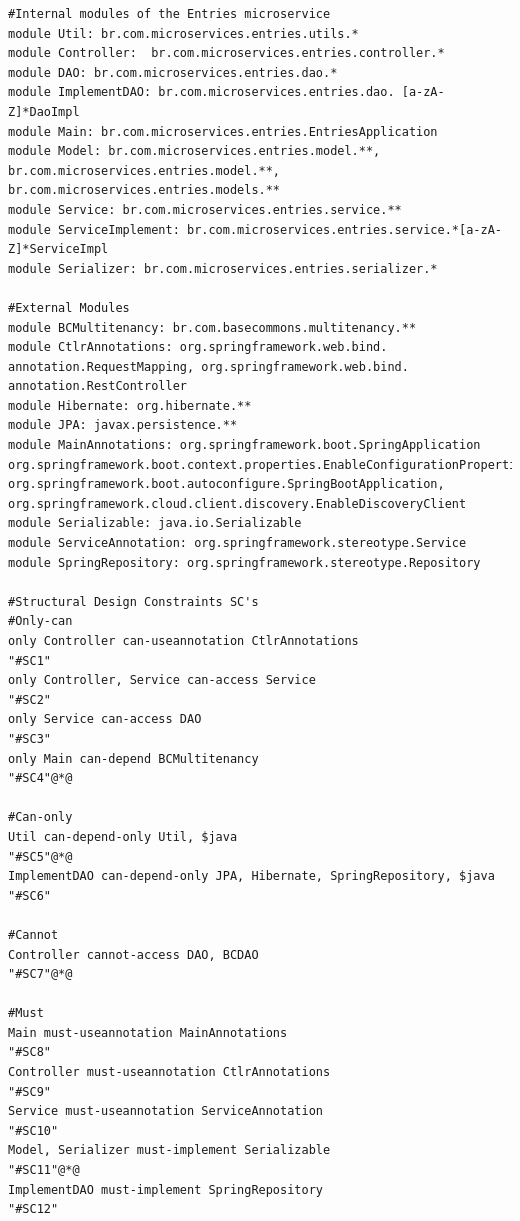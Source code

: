 \documentclass[12pt]{article}
\begin{document}
\begin{lstlisting}[style=colorido, caption={ \textcolor{blue}{Entries microservice's architectural project specification.}},label={list:especArquiteturalEntries}
]
 #Internal modules of the Entries microservice
module Util: br.com.microservices.entries.utils.*
module Controller:  br.com.microservices.entries.controller.*
module DAO: br.com.microservices.entries.dao.*
module ImplementDAO: br.com.microservices.entries.dao. [a-zA-Z]*DaoImpl
module Main: br.com.microservices.entries.EntriesApplication
module Model: br.com.microservices.entries.model.**, br.com.microservices.entries.model.**, br.com.microservices.entries.models.**
module Service: br.com.microservices.entries.service.**
module ServiceImplement: br.com.microservices.entries.service.*[a-zA-Z]*ServiceImpl
module Serializer: br.com.microservices.entries.serializer.*

#External Modules
module BCMultitenancy: br.com.basecommons.multitenancy.**	
module CtlrAnnotations: org.springframework.web.bind. annotation.RequestMapping, org.springframework.web.bind. annotation.RestController
module Hibernate: org.hibernate.**
module JPA: javax.persistence.**
module MainAnnotations: org.springframework.boot.SpringApplication org.springframework.boot.context.properties.EnableConfigurationProperties, org.springframework.boot.autoconfigure.SpringBootApplication, org.springframework.cloud.client.discovery.EnableDiscoveryClient
module Serializable: java.io.Serializable
module ServiceAnnotation: org.springframework.stereotype.Service	
module SpringRepository: org.springframework.stereotype.Repository

#Structural Design Constraints SC's
#Only-can 
only Controller can-useannotation CtlrAnnotations																																	"#SC1"
only Controller, Service can-access Service																																							"#SC2"
only Service can-access DAO																																																							"#SC3"
only Main can-depend BCMultitenancy																																															"#SC4"@*@

#Can-only
Util can-depend-only Util, $java																																																		"#SC5"@*@
ImplementDAO can-depend-only JPA, Hibernate, SpringRepository, $java														"#SC6"

#Cannot
Controller cannot-access DAO, BCDAO																																															"#SC7"@*@

#Must
Main must-useannotation MainAnnotations																																											"#SC8"
Controller must-useannotation CtlrAnnotations																																					"#SC9"
Service must-useannotation ServiceAnnotation																																						"#SC10"
Model, Serializer must-implement Serializable																																					"#SC11"@*@
ImplementDAO must-implement SpringRepository																																						"#SC12"

\end{lstlisting}
\end{document}
